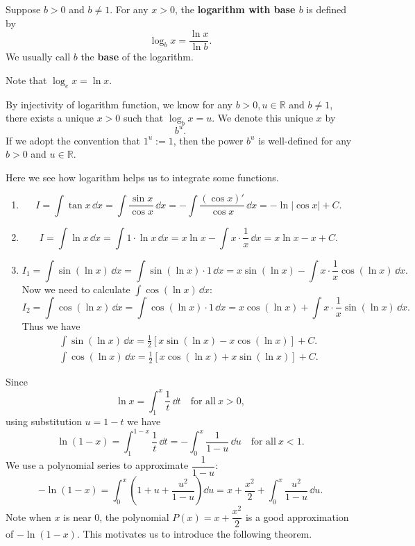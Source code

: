 \documentclass[a4paper]{ctexart}
\begin{document}
	\begin{mydef}
		Suppose $b>0$ and $b\neq 1$. For any $x>0$, the \textbf{logarithm with base $b$} is defined by
		\[
		\log_b x = \frac{\ln x}{\ln b}.
		\]
		We usually call $b$ the \textbf{base} of the logarithm.
	\end{mydef}
	\begin{myrmk}
		Note that $\log_e x = \ln x$.
	\end{myrmk}
	\begin{myrmk}
		By injectivity of logarithm function, we know for any $b>0, u\in \mathbb{R}$ and $b\neq 1$, there exists a unique $x>0$ such that $\log_b x = u$. We denote this unique $x$ by
		\[
		b^u.
		\]
		If we adopt the convention that $1^u := 1$, then the power $b^u$ is well-defined for any $b>0$ and $u\in \mathbb{R}$.
	\end{myrmk}
	\begin{myex}
		Here we see how logarithm helps us to integrate some functions.
		\begin{enumerate}
			\item \[
			I = \int \tan x\, \dd x = \int \frac{\sin x}{\cos x}\, \dd x = -\int \frac{(\cos x)'}{\cos x} \, \dd x = -\ln |\cos x| + C.
			\]
			\item \[
			I = \int \ln x \, \dd x = \int 1 \cdot \ln x\, \dd x = x \ln x - \int x \cdot \frac{1}{x}\, \dd x = x \ln x - x + C.
			\]
			\item \[
			I_1 = \int \sin(\ln x)\, \dd x = \int \sin(\ln x) \cdot 1\, \dd x = x \sin(\ln x) - \int x \cdot \frac{1}{x} \cos(\ln x)\, \dd x.
			\]
			Now we need to calculate $\int \cos(\ln x)\, \dd x$:
			\[
			I_2 = \int \cos(\ln x)\, \dd x = \int \cos(\ln x) \cdot 1\, \dd x = x \cos(\ln x) + \int x \cdot \frac{1}{x} \sin(\ln x)\, \dd x.
			\]
			Thus we have
			\[
			\begin{aligned}
				\int \sin(\ln x)\, \dd x = \frac12 \left[ x \sin(\ln x) - x \cos(\ln x) \right] + C.\\
				\int \cos(\ln x)\, \dd x = \frac12 \left[ x \cos(\ln x) + x \sin(\ln x) \right] + C.
			\end{aligned}
			\]
		\end{enumerate}
	\end{myex}
	\begin{myrmk}
		Since
		\[
		\ln x = \int_1^x \frac{1}{t}\, \dd t\quad \text{for all}\ x>0,
		\]
		using substitution $u = 1-t$ we have
		\[
		\ln (1-x) = \int_1^{1-x} \frac{1}{t}\, \dd t = -\int_0^x \frac{1}{1-u}\, \dd u \quad \text{for all}\ x<1.
		\]
		We use a polynomial series to approximate $\dfrac{1}{1-u}$:
		\[
		-\ln (1-x) = \int_0^x \left( 1 + u + \frac{u^2}{1-u} \right) \dd u = x + \frac{x^2}{2} + \int_0^x \frac{u^2}{1-u}\, \dd u.
		\]
		Note when $x$ is near $0$, the polynomial $P(x)=x + \dfrac{x^2}{2}$ is a good approximation of $-\ln(1-x)$. This motivates us to introduce the following theorem.
	\end{myrmk}
\end{document}

